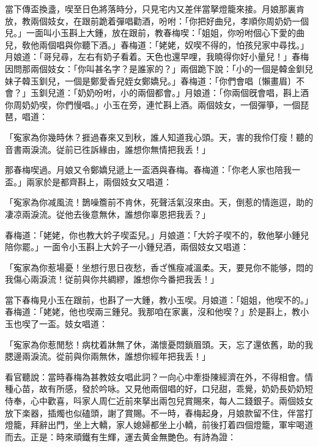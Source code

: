 當下傳盃換盞，喫至日色將落時分，只見宅内又差伴當拏燈籠來接。月娘那裏肯放，教兩個妓女，在跟前跪着彈唱勸酒，吩咐：「你把好曲兒，孝順你周奶奶一個兒。」一面叫小玉斟上大鍾，放在跟前，教春梅喫：「姐姐，你吩咐個心下愛的曲兒，敎他兩個唱與你聽下酒。」春梅道：「姥姥，奴喫不得的，怕孩兒家中尋找。」月娘道：「哥兒尋，左右有奶子看着。天色也還早哩，我曉得你好小量兒！」春梅因問那兩個妓女：「你叫甚名字？是誰家的？」兩個跪下說：「小的一個是韓金釧兒妹子韓玉釧兒，一個是鄭愛香兒姪女鄭嬌兒。」春梅道：「你們會唱〔懶畫眉〕不會？」玉釧兒道：「奶奶吩咐，小的兩個都會。」月娘道：「你兩個旣會唱，斟上酒你周奶奶喫，你們慢唱。」小玉在旁，連忙斟上酒。兩個妓女，一個彈箏，一個琵琶，唱道：

\begin{myquote}
「寃家為你幾時休？捱過春來又到秋，誰人知道我心頭。天，害的我伶仃瘦！聽的音書兩淚流。従前已徃訴緣由，誰想你無情把我丢！」
\end{myquote}

那春梅喫過。月娘又令鄭嬌兒遞上一盃酒與春梅。春梅道：「你老人家也陪我一盃。」兩家於是都齊斟上，兩個妓女又唱道：

\begin{myquote}
「寃家為你减風流！鵲噪簷前不肯休，死聲活氣沒來由。天，倒惹的情迤逗，助的凄凉兩淚流。従他去後意無休，誰想你辜恩把我丢？」
\end{myquote}

春梅道：「姥姥，你也教大妗子喫盃兒。」月娘道：「大妗子喫不的，敎他拏小鍾兒陪你罷。」一面令小玉斟上大妗子一小鍾兒酒，兩個妓女又唱道：

\begin{myquote}
「寃家為你惹場憂！坐想行思日夜愁，香ざ憔瘦减溫柔。天，要見你不能够，悶的我傷心兩淚流！従前與你共綢繆，誰想你今番把我丢！」
\end{myquote}

當下春梅見小玉在跟前，也斟了一大鍾，教小玉喫。月娘道：「姐姐，他喫不的。」春梅道：「姥姥，他也喫兩三鍾兒。我那咱在家裏，沒和他喫？」於是斟上，教小玉也喫了一盃。妓女唱道：

\begin{myquote}
「寃家為你惹閒愁！病枕着牀無了休，滿懷憂悶鎖眉頭。天，忘了還依舊，助的我腮邊兩淚流。從前與你兩無休，誰想你經年把我丢！」
\end{myquote}

看官聽說：當時春梅為甚教妓女唱此詞？一向心中牽掛陳經濟在外，不得相會。情種心苗，故有所感，發於吟咏。又見他兩個唱的好，口兒甜，乖覺，奶奶長奶奶短侍奉，心中歡喜，呌家人周仁近前來拏出兩包兒賞賜來，每人二錢銀子。兩個妓女放下楽器，插燭也似磕頭，謝了賞賜。不一時，春梅起身，月娘款留不住，伴當打燈籠，拜辭出門，坐上大轎，家人媳婦都坐上小轎，前後打着四個燈籠，軍牢喝道而去。正是：時來頑鐵有生輝，運去黄金無艷色。有詩為證：

